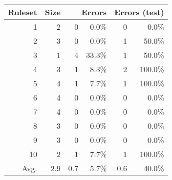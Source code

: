\documentclass{article}
\begin{document}
\begin{itemize}
\begin{tabular}{|r|r|rr|rr|}
\hline
 Ruleset & 
 Size & 
 \multicolumn{2}{1|}{Errors} & 
 \multicolumn{2}{1|}{Errors (test)} \\
\hline\hline
       1 &    2 &    0 &  0.0\%  &    0 &   0.0\% \\
       2 &    3 &    0 &  0.0\%  &    1 &  50.0\% \\
       3 &    1 &    4 & 33.3\%  &    1 &  50.0\% \\
       4 &    3 &    1 &  8.3\%  &    2 & 100.0\% \\
       5 &    4 &    1 &  7.7\%  &    1 & 100.0\% \\
       6 &    4 &    0 &  0.0\%  &    0 &   0.0\% \\
       7 &    4 &    0 &  0.0\%  &    0 &   0.0\% \\
       8 &    3 &    0 &  0.0\%  &    0 &   0.0\% \\
       9 &    3 &    0 &  0.0\%  &    0 &   0.0\% \\
      10 &    2 &    1 &  7.7\%  &    1 & 100.0\% \\
\hline\hline
    Avg. &  2.9 &  0.7 &  5.7\%  &  0.6 &  40.0\% \\
\hline
\end{tabular}



\end{itemize}
\end{document}
